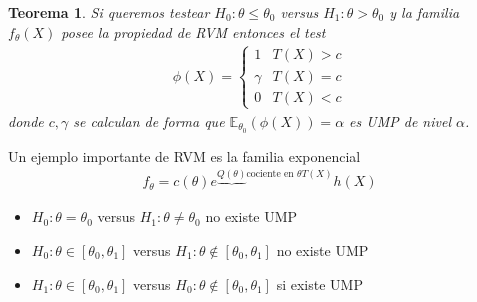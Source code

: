 \documentclass[10pt]{article}
\theoremstyle{plain}
\newtheorem{teo}{Teorema}
\theoremstyle{definition}
\begin{document}
\begin{teo}
Si queremos testear  $H_{0}: \theta \le \theta_{0}$ versus $H_{1}:\theta>\theta_{0}$ y la familia $f_{\theta}(X)$ posee la propiedad de RVM entonces el test
\begin{align*}
\phi(X) =%
   \begin{cases}
    1  & T(X)>c \\
    \gamma & T(X) = c \\
    0 & T(X) < c
  \end{cases}
\end{align*}
donde $c,\gamma$ se calculan de forma que $\mathbb{E}_{\theta_{0}}(\phi(X)) = \alpha$ es UMP de nivel $\alpha$.
\end{teo}

Un ejemplo importante de RVM es la familia exponencial
\begin{align*}
f_{\theta} = c(\theta)e^{\underbrace{Q(\theta)}{\text{cociente en $\theta$}}T(X)}h(X)
\end{align*}
\begin{itemize}
\item $H_{0}: \theta = \theta_{0}$ versus $H_{1}: \theta \not= \theta_{0}$ no existe UMP
\item $H_{0}: \theta \in [\theta_{0},\theta_{1}]$  versus $H_{1}: \theta \not\in [\theta_{0},\theta_{1}]$ no existe UMP
\item $H_{1}: \theta \in [\theta_{0},\theta_{1}]$  versus $H_{0}: \theta \not\in [\theta_{0},\theta_{1}]$ si existe UMP
\end{itemize}
\end{document}
